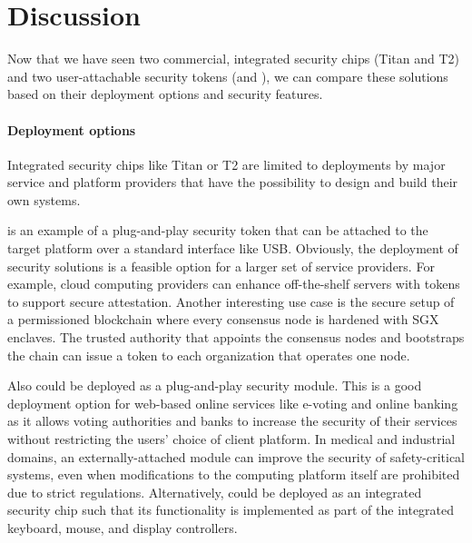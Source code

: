 
\section*{Discussion}

Now that we have seen two commercial, integrated security chips (Titan and T2) and two user-attachable security tokens (\protection and \proximitee), we can compare these solutions based on their deployment options and security features. 

\paragraph{Deployment options}
Integrated security chips like Titan or T2 are limited to deployments by major service and platform providers that have the possibility to design and build their own systems. 

\proximitee is an example of a plug-and-play security token that can be attached to the target platform over a standard interface like USB. Obviously, the deployment of security solutions is a feasible option for a larger set of service providers. For example, cloud computing providers can enhance off-the-shelf servers with \proximitee tokens to support secure attestation. Another interesting use case is the secure setup of a permissioned blockchain where every consensus node is hardened with SGX enclaves. The trusted authority that appoints the consensus nodes and bootstraps the chain can issue a \key token to each organization that operates one node.

Also \protection could be deployed as a plug-and-play security module. This is a good deployment option for web-based online services like e-voting and online banking as it allows voting authorities and banks to increase the security of their services without restricting the users' choice of client platform. In medical and industrial domains, an externally-attached \protection module can improve the security of safety-critical systems, even when modifications to the computing platform itself are prohibited due to strict regulations. Alternatively, \protection could be deployed as an integrated security chip such that its functionality is implemented as part of the integrated keyboard, mouse, and display controllers. 


